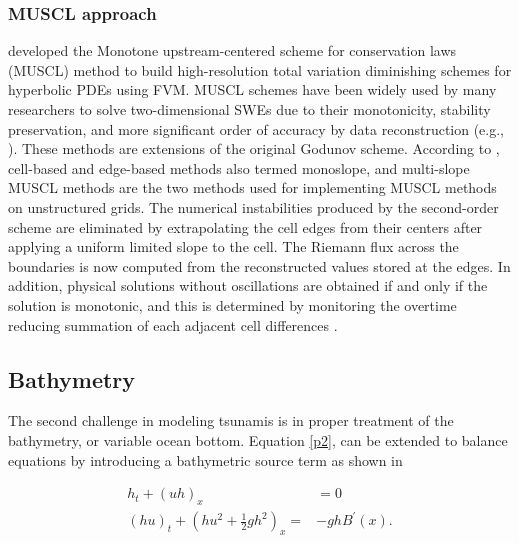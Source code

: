 \documentclass[11pt,a4paper]{article}
\newcommand{\donna}[1]{{\color{red}{#1}}}
\begin{document}
	\subsubsection{MUSCL approach}
\donna{This is a type of FV method; keep at same level as Wave Propagation Algorithm as above.}
\citet{van1979towards} developed the Monotone upstream-centered scheme for conservation laws (MUSCL) method to build high-resolution total variation diminishing schemes  for hyperbolic PDEs using FVM. MUSCL schemes have been widely used by many researchers to solve two-dimensional SWEs due to their monotonicity, stability preservation, and more significant order of accuracy by data reconstruction (e.g., \cite{song2011robust,zhao2019improved,marche2007evaluation,liang2009adaptive}).  These methods are extensions of the original Godunov scheme. According to \citet{hou20132d}, cell-based and edge-based methods  also termed monoslope, and multi-slope MUSCL methods are the two methods used for implementing MUSCL methods on unstructured grids. The numerical instabilities produced by the second-order scheme are eliminated by extrapolating the cell edges from their centers after applying a uniform limited slope to the cell. The Riemann flux across the boundaries is now computed from the reconstructed values stored at the edges.   In addition, physical solutions without oscillations are obtained if and only if the solution is monotonic, and this is determined by monitoring the overtime reducing summation of each adjacent cell differences \cite{hou2014multislope}.




	
	\subsection{Bathymetry}
	The second challenge in modeling tsunamis is in proper treatment of the bathymetry, or variable ocean bottom. 
	Equation \eqref{p2}, can be extended to balance equations by introducing a bathymetric source term as shown in 

		\begin{equation}
		\begin{aligned}
			h_{t} + (uh)_x &= 0 \\
			(hu)_t + \left(hu^{2} + \frac{1}{2}gh^{2} \right)_x =& -ghB^{\prime}(x).
			\label{bst}
		\end{aligned}
	\end{equation}
\end{document}
